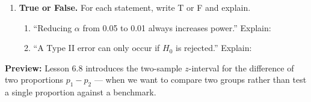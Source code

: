 \documentclass[10pt]{article}
\begin{document}
\begin{enumerate}
  \newpage
  \item \textbf{True or False.} For each statement, write T or F and explain.
        \begin{enumerate}[label=\alph*.]
          \item ``Reducing $\alpha$ from 0.05 to 0.01 always increases power.''
                \rlap{\gradedblank[id=hw3a1, type=choice, points=1, answer=F]{1cm}{0.17in}}\phantom{\blank{1cm}} Explain: 
          \item ``A Type II error can only occur if $H_0$ is rejected.''
                \rlap{\gradedblank[id=hw3b1, type=choice, points=1, answer=F]{1cm}{0.17in}}\phantom{\blank{1cm}} Explain: 
        \end{enumerate}

\end{enumerate}

\begin{reflectionbox}
\textbf{Preview:} Lesson 6.8 introduces the two-sample $z$-interval for the difference
of two proportions $p_1 - p_2$ --- when we want to compare two groups rather than test
a single proportion against a benchmark.
\end{reflectionbox}
\end{document}
